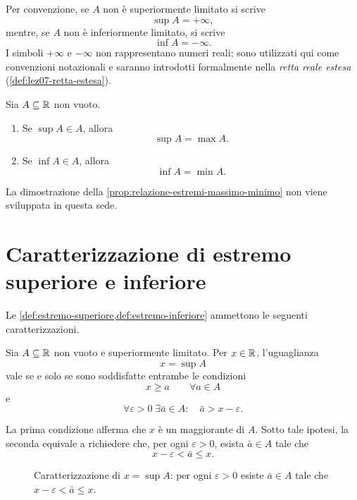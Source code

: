 Per convenzione, se \(A\) non è superiormente limitato si scrive
\[
  \sup A=+\infty,
\]
mentre, se \(A\) non è inferiormente limitato, si scrive
\[
  \inf A=-\infty.
\]
I simboli \(+\infty\) e \(-\infty\) non rappresentano numeri reali;
sono utilizzati qui come convenzioni notazionali e saranno
introdotti formalmente nella \emph{retta reale estesa}
(\cref{def:lez07-retta-estesa}).

\begin{proposition}
\label{prop:relazione-estremi-massimo-minimo}
Sia \(A\subseteq\mathbb{R}\) non vuoto.
\begin{enumerate}
  \item Se \(\sup A\in A\), allora
  \[
    \sup A=\max A.
  \]
  \item Se \(\inf A\in A\), allora
  \[
    \inf A=\min A.
  \]
\end{enumerate}
\end{proposition}

La dimostrazione della \cref{prop:relazione-estremi-massimo-minimo}
non viene sviluppata in questa sede.

\clearpage

\section{Caratterizzazione di estremo superiore e inferiore}
\label{sec:lez04-caratterizzazione-estremi}

Le \cref{def:estremo-superiore,def:estremo-inferiore}
ammettono le seguenti caratterizzazioni.

\begin{theorem}
\label{thm:caratterizzazione-sup}
Sia \(A\subseteq\mathbb{R}\) non vuoto e superiormente limitato.
Per \(x\in\mathbb{R}\), l'uguaglianza
\[
  x=\sup A
\]
vale se e solo se sono soddisfatte entrambe le condizioni
\[
  x\ge a\qquad\forall a\in A
\]
e
\[
  \forall\varepsilon>0\;\exists\bar a\in A:
  \quad\bar a>x-\varepsilon.
\]
\end{theorem}

La prima condizione afferma che \(x\) è un maggiorante di \(A\).
Sotto tale ipotesi, la seconda equivale a richiedere che,
per ogni \(\varepsilon>0\), esista \(\bar a\in A\) tale che
\[
  x-\varepsilon<\bar a\le x.
\]

\begin{figure}[htbp]
  \centering
  
  \caption{Caratterizzazione di \(x=\sup A\): per ogni
  \(\varepsilon>0\) esiste \(\bar a\in A\) tale che
  \(x-\varepsilon<\bar a\le x\).}
  \label{fig:caratterizzazione-sup}
\end{figure}

